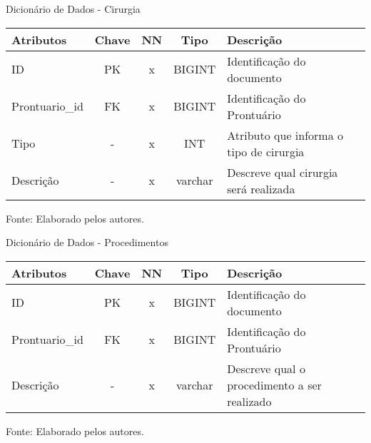 \documentclass[
    12pt,               %
    openright,          %
    oneside,
    a4paper,            %
    BIBLATEX,           %
    TODO,               %
    english,            %
    brazil              %
    ]{ifsp-spo-inf-ctds}
\begin{document}
\begin{center}
                        \begin{quadro}[H]
                        \centering
                            \caption{Dicionário de Dados - Cirurgia}
                            \begin{tabulary}{1.0\textwidth}{|p{9em}|c|c|c|p{19em}|}
                          \hline
                          Atributos & Chave & NN & Tipo & Descrição\\
                          \hline
                          ID & PK & x & BIGINT & Identificação do documento \\
                          \hline
                          Prontuario\_id & FK & x & BIGINT & Identificação do Prontuário \\
                          \hline
                          Tipo & - & x & INT & Atributo que informa o tipo de cirurgia \\
                          \hline
                          Descrição & - & x & varchar & Descreve qual cirurgia será realizada\\
                          \hline
                          \end{tabulary}
                           
                            \label{qd: md-cirurgia}
                            \centering
                          {\footnotesize Fonte: Elaborado pelos autores.}
                        \end{quadro}
                      \end{center} 


\begin{center}
                        \begin{quadro}[H]
                        \centering
                            \caption{Dicionário de Dados - Procedimentos}
                            \begin{tabulary}{1.0\textwidth}{|p{9em}|c|c|c|p{19em}|}
                          \hline
                          Atributos & Chave & NN & Tipo & Descrição\\
                          \hline
                          ID & PK & x & BIGINT & Identificação do documento \\
                          \hline
                          Prontuario\_id & FK & x & BIGINT & Identificação do Prontuário \\
                          \hline
                          Descrição & - & x & varchar & Descreve qual o procedimento a ser realizado\\
                          \hline
                          \end{tabulary}
                           
                            \label{qd: md-procedimento}
                            \centering
                          {\footnotesize Fonte: Elaborado pelos autores.}
                        \end{quadro}
                      \end{center} 
\end{document}
